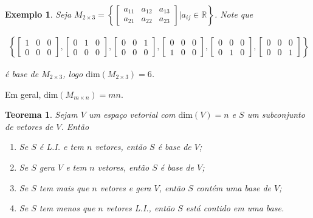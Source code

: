 \documentclass{article}
\newtheorem{theorem}{Teorema}[section]
\newtheorem*{example}{Exemplo}
\begin{document}
\begin{example}
	Seja $M_{2\times 3} =  \left\{ \begin{bmatrix}
	a_{11} & a_{12} & a_{13} \\
	a_{21} & a_{22} & a_{23}
	\end{bmatrix}\Bigg| a_{ij}\in\mathbb{R} \right\} $. Note que 
	
	\begin{align*}
	\left\{    \begin{bmatrix}
	1 & 0 & 0 \\
	0 & 0 & 0 
	\end{bmatrix} , \begin{bmatrix}
	0 & 1 & 0 \\
	0 & 0 & 0 
	\end{bmatrix}  , \begin{bmatrix}
	0 & 0 & 1 \\
	0 & 0 & 0 
	\end{bmatrix}  , \begin{bmatrix}
	0 & 0 & 0 \\
	1 & 0 & 0 
	\end{bmatrix}  , \begin{bmatrix}
	0 & 0 & 0 \\
	0 & 1 & 0 
	\end{bmatrix}  , \begin{bmatrix}
	0 & 0 & 0 \\
	0 & 0 & 1 
	\end{bmatrix}          \right\}
	\end{align*}
	
	\par\vspace{0.3cm} é base de $M_{2\times 3}$, logo $\text{dim}(M_{2\times 3}) = 6$. 
	
\end{example}

\par\vspace{0.3cm} Em geral, $\text{dim}(M_{m\times n}) = mn$.

\begin{theorem}
	Sejam $V$ um espaço vetorial com $\text{dim}(V) = n$ e $S$ um subconjunto de vetores de $V$. Então
	
	\begin{enumerate}
		\item Se $S$ é L.I. e tem $n$ vetores, então $S$ é base de $V$;
		\item Se $S$ gera $V$ e tem $n$ vetores, então $S$ é base de $V$;
		\item Se $S$ tem mais que $n$ vetores e gera $V$, então $S$ contém uma base de $V$;
		\item Se $S$ tem menos que $n$ vetores L.I., então $S$ está contido em uma base.
	\end{enumerate}
	
\end{theorem}
\end{document}
